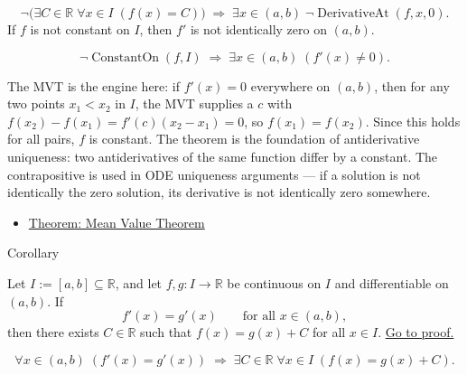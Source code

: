 \begin{remark*}
\[
\lnot\bigl(\exists C \in \mathbb{R}\;\forall x \in I\;(f(x)=C)\bigr)
\;\Rightarrow\;
\exists x \in (a,b)\;\lnot\operatorname{DerivativeAt}(f,x,0).
\]
If $f$ is not constant on $I$, then $f'$ is not identically zero on $(a,b)$.
\end{remark*}

\begin{remark*}
\[
\lnot\operatorname{ConstantOn}(f,I) \;\Rightarrow\; \exists x \in (a,b)\;(f'(x) \neq 0).
\]
\end{remark*}

\begin{remark*}[Interpretation]
The MVT is the engine here: if $f'(x) = 0$ everywhere on $(a,b)$, then for any two points $x_1 < x_2$ in $I$, the MVT supplies a $c$ with $f(x_2)-f(x_1) = f'(c)(x_2-x_1) = 0$, so $f(x_1) = f(x_2)$. Since this holds for all pairs, $f$ is constant. The theorem is the foundation of antiderivative uniqueness: two antiderivatives of the same function differ by a constant. The contrapositive is used in ODE uniqueness arguments --- if a solution is not identically the zero solution, its derivative is not identically zero somewhere.
\end{remark*}

\begin{dependencies}
\begin{itemize}
  \item \hyperref[thm:mean-value-theorem]{Theorem: Mean Value Theorem}
\end{itemize}
\end{dependencies}


\begin{corollarybox}{Corollary}
\begin{corollary}
\label{cor:equal-derivatives-constant-difference}
Let $I := [a,b] \subseteq \mathbb{R}$, and let $f, g : I \to \mathbb{R}$ be continuous on $I$ and differentiable on $(a,b)$. If
\[
f'(x) = g'(x) \qquad \text{for all } x \in (a,b),
\]
then there exists $C \in \mathbb{R}$ such that $f(x) = g(x) + C$ for all $x \in I$.
\hyperref[prf:equal-derivatives-constant-difference]{Go to proof.}
\end{corollary}
\end{corollarybox}

\begin{remark*}
\[
\forall x \in (a,b)\;(f'(x)=g'(x))
\;\Rightarrow\;
\exists C \in \mathbb{R}\;\forall x \in I\;(f(x)=g(x)+C).
\]
\end{remark*}

